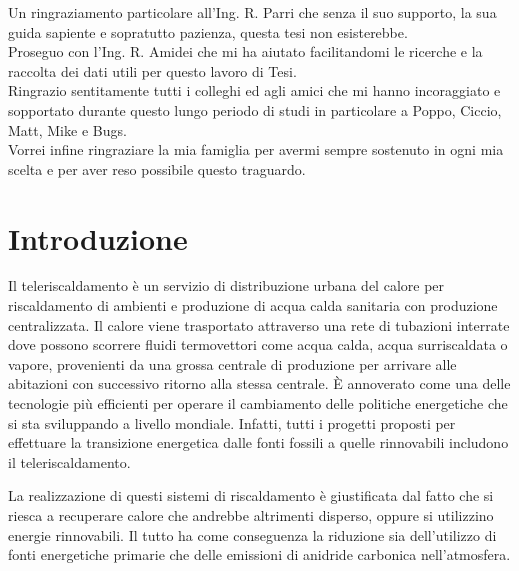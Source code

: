 \documentclass[laurea,oneside,11pt]{USiena_tesiLM3}
\begin{document}
Un ringraziamento particolare all'Ing. R. Parri che senza il suo supporto, la sua guida sapiente e sopratutto pazienza, questa tesi non esisterebbe. \\

Proseguo con l'Ing. R. Amidei che mi ha aiutato facilitandomi le ricerche e la raccolta dei dati utili per questo lavoro di Tesi.\\

Ringrazio sentitamente tutti i colleghi ed agli amici che mi hanno incoraggiato e sopportato durante questo lungo periodo di studi in particolare a Poppo, Ciccio, Matt, Mike e Bugs. \\

Vorrei infine ringraziare la mia famiglia per avermi sempre sostenuto in ogni mia scelta e per aver reso possibile questo traguardo.            %
\
%
\tableofcontents            %
%


\mainmatter

\chapter*{Introduzione}

Il teleriscaldamento è un  servizio  di  distribuzione  urbana  del calore per  riscaldamento di ambienti e produzione di acqua calda sanitaria con produzione centralizzata. Il calore viene trasportato attraverso una rete di tubazioni interrate dove possono scorrere  fluidi termovettori come acqua calda, acqua surriscaldata o vapore, provenienti da una grossa centrale di produzione per arrivare alle abitazioni con successivo ritorno alla stessa centrale. È annoverato come una delle tecnologie più efficienti per operare il cambiamento delle politiche energetiche che si sta sviluppando a livello mondiale. Infatti, tutti i progetti proposti per effettuare la transizione energetica dalle fonti fossili a quelle rinnovabili includono il teleriscaldamento. 

La realizzazione di questi sistemi di riscaldamento è giustificata dal fatto che si riesca a recuperare calore che andrebbe altrimenti disperso, oppure si utilizzino energie rinnovabili. Il tutto ha come conseguenza la riduzione sia dell'utilizzo di fonti energetiche primarie che delle emissioni di anidride carbonica nell'atmosfera.
\end{document}
